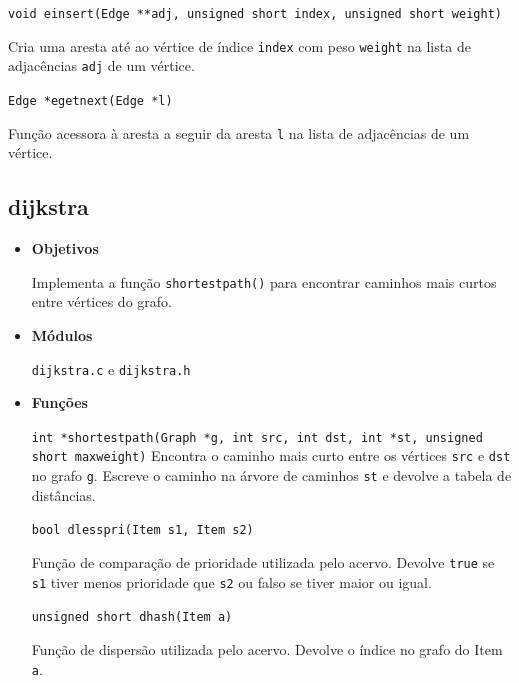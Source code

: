 \documentclass[portuguese, a4paper]{article}
\newcommand\tu[0]{\textunderscore}
\begin{document}
\begin{itemize}
		\par\null\par
		\texttt{void e\tu insert(Edge **adj, unsigned short index, unsigned short
				weight)}
		\par
		Cria uma aresta até ao vértice de índice \texttt{index} com peso
		\texttt{weight} na lista de adjacências \texttt{adj} de um vértice.

		\par\null\par
		\texttt{Edge *e\tu get\tu next(Edge *l)}
		\par
		Função acessora à aresta a seguir da aresta \texttt{l} na lista de
		adjacências de um vértice.
	\end{itemize}

	\subsection{dijkstra}
	\begin{itemize}
		\item \textbf{Objetivos}
		\par
		Implementa a função \texttt{shortest\tu path()} para encontrar caminhos
		mais curtos entre vértices do grafo.

		\item \textbf{Módulos}
		\par
		\texttt{dijkstra.c} e \texttt{dijkstra.h}

		\item \textbf{Funções}
		\par
		\texttt{int *shortest\tu path(Graph *g, int src, int dst, int *st,
		unsigned short max\tu weight)}
		Encontra o caminho mais curto entre os vértices \texttt{src} e
		\texttt{dst} no grafo \texttt{g}. Escreve o caminho na árvore de
		caminhos \texttt{st} e devolve a tabela de distâncias.

		\par\null\par
		\texttt{bool d\tu less\tu pri(Item s1, Item s2)}
		\par
		Função de comparação de prioridade utilizada pelo acervo. Devolve
		\texttt{true} se \texttt{s1} tiver menos prioridade que \texttt{s2} ou
		falso se tiver maior ou igual.

		\par\null\par
		\texttt{unsigned short d\tu hash(Item a)}
		\par
		Função de dispersão utilizada pelo acervo. Devolve o índice no grafo do
		Item \texttt{a}.
	\end{itemize}
\end{document}
